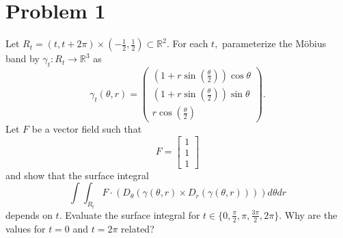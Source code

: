 \documentclass[11pt]{article}
\newcommand{\bbR}{\mathbb{R}}
\begin{document}
	
	
	\psetheader
\section*{Problem 1}
\begin{problem}
Let $R_t = (t, t + 2\pi )\times (-\frac{1}{2}, \frac{1}{2})\subset \bbR^2.$ For each $t,$ parameterize the M\"{o}bius band by $\gamma_t: R_t \to \bbR^3$ as 
\[\gamma_t(\theta, r) = \begin{pmatrix}
    (1 + r\sin(\frac{\theta}{2}))\cos\theta\\
    (1 + r\sin(\frac{\theta}{2}))\sin\theta\\
    r\cos(\frac{\theta}{2})
\end{pmatrix}.\] Let $F$ be a vector field such that 
\[F = \begin{bmatrix}
    1\\1\\1
\end{bmatrix}\] and show that the surface integral 
\[\int\int_{R_t} F \cdot \left(D_\theta(\gamma(\theta, r)\times D_r(\gamma(\theta, r)))\right)d\theta dr\] depends on $t.$ Evaluate the surface integral for $t\in\{0,\frac{\pi}{2},\pi,\frac{3\pi}{2},2\pi\}$. Why are the values for $t=0$ and $t=2\pi$ related?
\end{problem}
\end{document}
